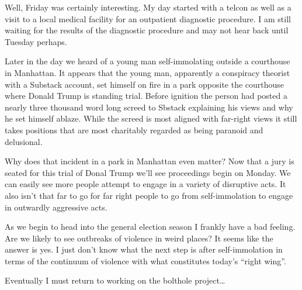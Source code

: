 Well, Friday was certainly interesting. My day started with a telcon as
well as a visit to a local medical facility for an outpatient diagnostic
procedure. I am still waiting for the results of the diagnostic
procedure and may not hear back until Tuesday perhaps.

Later in the day we heard of a young man self-immolating outside a
courthouse in Manhattan. It appears that the young man, apparently a
conspiracy theorist with a Substack account, set himself on fire in a
park opposite the courthouse where Donald Trump is standing trial.
Before ignition the person had posted a nearly three thousand word long
screed to Sbstack explaining his views and why he set himself ablaze.
While the screed is most aligned with far-right views it still takes
positions that are most charitably regarded as being paranoid and
delusional.

Why does that incident in a park in Manhattan even matter? Now that a
jury is seated for this trial of Donal Trump we'll see proceedings begin
on Monday. We can easily see more people attempt to engage in a variety
of disruptive acts. It also isn't that far to go for far right people to
go from self-immolation to engage in outwardly aggressive acts.

As we begin to head into the general election season I frankly have a
bad feeling. Are we likely to see outbreaks of violence in weird places?
It seems like the answer is yes. I just don't know what the next step is
after self-immolation in terms of the continuum of violence with what
constitutes today's ``right wing''.

Eventually I must return to working on the bolthole project\ldots{}
